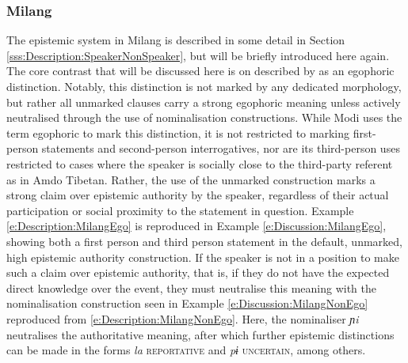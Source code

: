\subsubsection{Milang}\label{sss:Discussion:MilangCase}
The epistemic system in Milang is described in some detail in Section \ref{sss:Description:SpeakerNonSpeaker}, but will be briefly introduced here again. The core contrast that will be discussed here is on described by \cite{Modi2017} as an egophoric distinction. Notably, this distinction is not marked by any dedicated morphology, but rather all unmarked clauses carry a strong egophoric meaning unless actively neutralised through the use of nominalisation constructions.  While Modi uses the term egophoric to mark this distinction, it is not restricted to marking first-person statements and second-person interrogatives, nor are its third-person uses restricted to cases where the speaker is socially close to the third-party referent as in Amdo Tibetan. Rather, the use of the unmarked construction marks a strong claim over epistemic authority by the speaker, regardless of their actual participation or social proximity to the statement in question. Example \ref{e:Description:MilangEgo} is reproduced in Example \ref{e:Discussion:MilangEgo}, showing both a first person and third person statement in the default, unmarked, high epistemic authority construction. If the speaker is not in a position to make such a claim over epistemic authority, that is, if they do not have the expected direct knowledge over the event, they must neutralise this meaning with the nominalisation construction seen in Example \ref{e:Discussion:MilangNonEgo} reproduced from \ref{e:Description:MilangNonEgo}. Here, the nominaliser \textit{ɲi} neutralises the authoritative meaning, after which further epistemic distinctions can be made in the forms \textit{la} \textsc{reportative} and \textit{pɨ} \textsc{uncertain}, among others.

